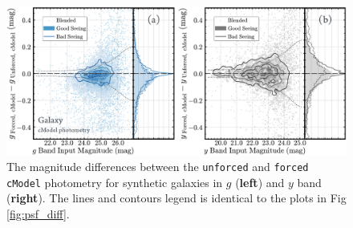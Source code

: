 \documentclass[useamsfonts]{pasj01}
\def\cmodel{\texttt{cModel}}
\def\forced{\texttt{forced}}
\def\unforced{\texttt{unforced}}
\begin{document}
\begin{figure}
    \begin{center}
        \includegraphics[width=\textwidth]{fig/synpipe_cmodel_diff}
    \end{center}
    \caption{
        The magnitude differences between the \unforced{} and \forced{}
        \cmodel{} photometry for synthetic galaxies in $g$ (\textbf{left}) and
        $y$ band (\textbf{right}).
        The lines and contours legend is identical to the plots in Fig 
        \ref{fig:psf_diff}.
        }
    \label{fig:cmodel_diff}
\end{figure}
\end{document}
